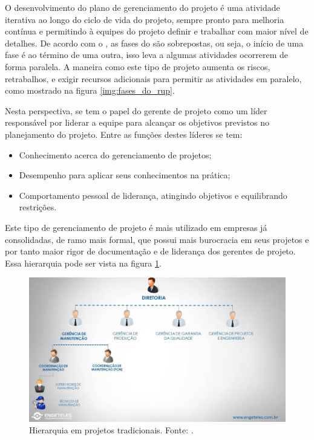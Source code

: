 O desenvolvimento do plano de gerenciamento do projeto é uma atividade iterativa ao longo do ciclo de vida do projeto, sempre pronto para melhoria contínua e permitindo à equipes do projeto definir e trabalhar com maior nível de detalhes. De acordo com o \cite{pmbok}, as fases do \cite{rup} são sobrepostas, ou seja, o início de uma fase é ao término de uma outra, isso leva a algumas atividades ocorrerem de forma paralela. A maneira como este tipo de projeto aumenta os riscos, retrabalhos, e exigir recursos adicionais para permitir as atividades em paralelo, como mostrado na figura \ref{img:fases_do_rup}.

Nesta perspectiva, se tem o papel do gerente de projeto como um líder responsável por liderar a equipe para alcançar os objetivos previstos no planejamento do projeto. Entre as funções destes líderes se tem:

\begin{itemize}
    \item Conhecimento acerca do gerenciamento de projetos;
    \item Desempenho para aplicar seus conhecimentos na prática;
    \item Comportamento pessoal de liderança, atingindo objetivos e equilibrando restrições.
\end{itemize}

Este tipo de gerenciamento de projeto é mais utilizado em empresas já consolidadas, de ramo mais formal, que possui mais burocracia em seus projetos e por tanto maior rigor de documentação e de liderança dos gerentes de projeto. Essa hierarquia pode ser vista na figura \ref{img:gerencia_de_projetos_tradicional}.

\begin{figure}[H]
	\centering
	\includegraphics[width=1.0\textwidth]{figuras/gerencia_de_projeto.jpg}
	\caption{Hierarquia em projetos tradicionais. Fonte: \cite{gerentes_tradicionais}.}
	\label{img:gerencia_de_projetos_tradicional}
\end{figure}

